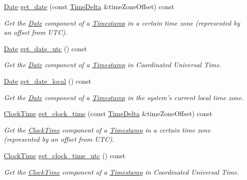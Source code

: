 \begin{DoxyCompactItemize}
\hyperlink{structDate}{Date} \hyperlink{structTimestamp_a07b4b2e5d95a2b23fe48c9682435c727}{get\-\_\-date} (const \hyperlink{structTimeDelta}{Time\-Delta} \&time\-Zone\-Offset) const 
\begin{DoxyCompactList}\small\item\em Get the \hyperlink{structDate}{Date} component of a \hyperlink{structTimestamp}{Timestamp} in a certain time zone (represented by an offset from U\-T\-C). \end{DoxyCompactList}\item 
\hyperlink{structDate}{Date} \hyperlink{structTimestamp_a4dd9ee5c1ceaad6d4f497487a3e666f5}{get\-\_\-date\-\_\-utc} () const 
\begin{DoxyCompactList}\small\item\em Get the \hyperlink{structDate}{Date} component of a \hyperlink{structTimestamp}{Timestamp} in Coordinated Universal Time. \end{DoxyCompactList}\item 
\hyperlink{structDate}{Date} \hyperlink{structTimestamp_a77a1ae0ca0b09af2adc5f7f49b6c6618}{get\-\_\-date\-\_\-local} () const 
\begin{DoxyCompactList}\small\item\em Get the \hyperlink{structDate}{Date} component of a \hyperlink{structTimestamp}{Timestamp} in the system's current local time zone. \end{DoxyCompactList}\item 
\hyperlink{structClockTime}{Clock\-Time} \hyperlink{structTimestamp_a8e4b0ee005f58cb645d945eaccd1bc9e}{get\-\_\-clock\-\_\-time} (const \hyperlink{structTimeDelta}{Time\-Delta} \&time\-Zone\-Offset) const 
\begin{DoxyCompactList}\small\item\em Get the \hyperlink{structClockTime}{Clock\-Time} component of a \hyperlink{structTimestamp}{Timestamp} in a certain time zone (represented by an offset from U\-T\-C). \end{DoxyCompactList}\item 
\hyperlink{structClockTime}{Clock\-Time} \hyperlink{structTimestamp_a0767fd3f69eaa11bb094eb330d9c88ef}{get\-\_\-clock\-\_\-time\-\_\-utc} () const 
\begin{DoxyCompactList}\small\item\em Get the \hyperlink{structClockTime}{Clock\-Time} component of a \hyperlink{structTimestamp}{Timestamp} in Coordinated Universal Time. \end{DoxyCompactList}\item 

\end{DoxyCompactItemize}
